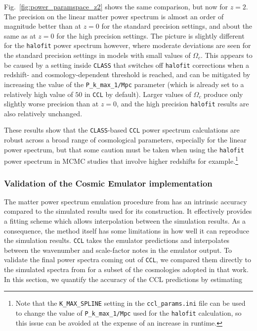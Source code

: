 \documentclass[\docopts]{\docclass}
\newcommand{\ccl}{{\tt CCL}\xspace}
\newcommand{\halofit}{{\tt halofit}\xspace}
\newcommand{\class}{{\tt CLASS}\xspace}
\begin{document}
Fig.~\ref{fig:power_paramspace_z2} shows the same comparison, but now for $z=2$. The precision on the linear matter power spectrum is almost an order of magnitude better than at $z=0$ for the standard precision settings, and about the same as at $z=0$ for the high precision settings. The picture is slightly different for the \halofit power spectrum however, where moderate deviations are seen for the standard precision settings in models with small values of $\Omega_c$. This appears to be caused by a setting inside \class that switches off \halofit corrections when a redshift- and cosmology-dependent threshold is reached, and can be mitigated by increasing the value of the {\tt P\_k\_max\_1/Mpc} parameter (which is already set to a relatively high value of $50$ in \ccl by default). Larger values of $\Omega_c$ produce only slightly worse precision than at $z=0$, and the high precision \halofit results are also relatively unchanged.

These results show that the \class-based \ccl power spectrum calculations are robust across a broad range of cosmological parameters, especially for the linear power spectrum, but that some caution must be taken when using the \halofit power spectrum in MCMC studies that involve higher redshifts for example.\footnote{Note that the {\tt K\_MAX\_SPLINE} setting in the {\tt ccl\_params.ini} file can be used to change the value of {\tt P\_k\_max\_1/Mpc} used for the \halofit calculation, so this issue can be avoided at the expense of an increase in runtime.}


\subsubsection{Validation of the Cosmic Emulator implementation}
\label{ss:cosmicemu}

The matter power spectrum emulation procedure from \citet{Lawrence17} has an intrinsic accuracy compared to the simulated results used for its construction. It effectively provides a fitting scheme which allows interpolation between the simulation results. As a consequence, the method itself has some limitations in how well it can reproduce the simulation results. \ccl takes the emulator predictions and interpolates between the wavenumber and scale-factor notes in the emulator output. To validate the final power spectra coming out of \ccl, we compared them directly to the simulated spectra from \citet{Lawrence17} for a subset of the cosmologies adopted in that work. In this section, we quantify the accuracy of the CCL predictions by estimating
\end{document}

